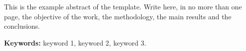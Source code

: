 \begin{abstracts}

This is the example abstract of the template. Write here, in no more than
one page, the objective of the work, the methodology, the main results and
the conclusions.

\vfill

\textbf{Keywords:} keyword 1, keyword 2, keyword 3.
\end{abstracts}
